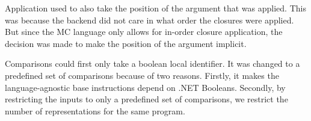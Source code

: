 Application used to also take the position of the argument that was applied.
This was because the backend did not care in what order the closures were applied.
But since the MC language only allows for in-order closure application, the decision was made to make the position of the argument implicit.

Comparisons could first only take a boolean local identifier.
It was changed to a predefined set of comparisons because of two reasons.
Firstly, it makes the language-agnostic base instructions depend on .NET Booleans.
Secondly, by restricting the inputs to only a predefined set of comparisons, we restrict the number of representations for the same program.
